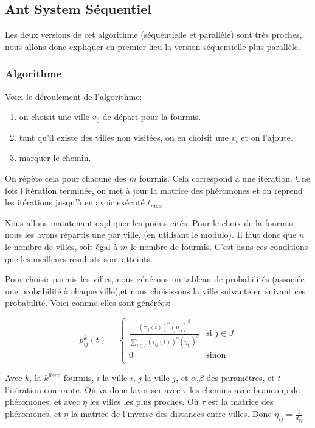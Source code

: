 \documentclass[a4paper, 11pt]{article}
\begin{document}
\subsection{Ant System Séquentiel}
Les deux versions de cet algorithme (séquentielle et parallèle) sont très proches, nous allons donc expliquer en premier lieu 
la version séquentielle plus parallèle.

\subsubsection{Algorithme}
Voici le déroulement de l'algorithme:
\begin{enumerate}
 \item on choisit une ville $v_0$ de départ pour la fourmis.
 \item tant qu'il existe des villes non visitées, on en choisit une $v_i$ et on l'ajoute.
 \item marquer le chemin.
\end{enumerate}

On répète cela pour chacune des $m$ fourmis. Cela correspond à une itération.
Une fois l'itération terminée, on met à jour la matrice des phéromones et on reprend les itérations jusqu'à en avoir exécuté $t_{max}$.

Nous allons maintenant expliquer les points cités.
Pour le choix de la fourmis, nous les avons répartis une par ville, (en utilisant le modulo). Il faut donc que $n$ le nombre de villes, 
soit égal à $m$ le nombre de fourmis. C'est dans ces conditions que les meilleurs résultats sont atteints.

Pour choisir parmis les villes, nous générons un tableau de probabilités (associée une probabilité à chaque ville),et nous choisissons 
la ville suivante en suivant ces probabilité.
Voici comme elles sont générées:
 \begin{center}
  \begin{displaymath}
    p_{ij}^k(t) = 
    \left\lbrace
      \begin{array}{ll}
	\frac{(\tau_{ij}(t))^{\alpha} (\eta_{ij})^{\beta}}{\sum_{l \in J} (\tau_{ij}(t))^{\alpha} (\eta_{ij})^{\beta}} & \text{si } 
	j \in J \\
	0 & \text{sinon } \\
      \end{array}
    \right.
\end{displaymath}
 \end{center}

Avec $k$, la $k^{\text{ième}}$ fourmis, $i$ la ville $i$, $j$ la ville $j$, et $\alpha$,$\beta$ des paramètres, et $t$ l'itération courrante.
On va donc favoriser avec $\tau$ les chemins avec beaucoup de phéromones; et avec $\eta$ les villes les plus proches.
Où $\tau$ est la matrice des phéromones, et $\eta$ la matrice de l'inverse des distances entre villes. Donc $\eta_{ij} = \frac{1}{d_{ij}}$
\end{document}

